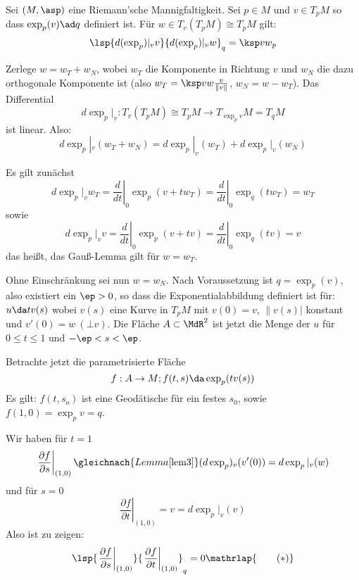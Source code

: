 \documentclass[a4paper,twoside,DIV15,BCOR12mm]{scrbook}
\begin{document}
\begin{satz}
\label{gausslemma} Sei $(M,\asp)$ eine Riemann’sche Mannigfaltigkeit. Sei $p\in M$ und $v\in T_pM$ so dass $\exp_p(v)\ad q$ definiert ist. Für $w\in T_v(T_pM) \cong T_pM$ gilt:
\[
\lsp {d(\exp_p)|_v v} {d(\exp_p)|_v w}_q = \ksp v w_p
\]
\end{satz}
\begin{beweis}
Zerlege $w = w_T + w_N$, wobei $w_T$ die Komponente in Richtung $v$ und $w_N$ die dazu orthogonale Komponente ist (also $w_T = \ksp v w \frac v {\|v\|}$, $w_N = w- w_T$). Das Differential 
\[
d\exp_p|_v : T_v(T_pM) \cong T_pM \to T_{\exp_pv}M = T_qM
\]
ist linear. Also: 
\[
d\exp_p|_v (w_T + w_N) = d\exp_p|_v(w_T) + d\exp_p|_v(w_N)
\]

Es gilt zunächst
\[
d\exp_p|_v w_T = \left.\frac d{dt}\right|_0 \exp_p(v + tw_T) = \left.\frac d{dt}\right|_0 \exp_q(tw_T) = w_T
\]
sowie
\[
d\exp_p|_v v = \left.\frac d{dt}\right|_0 \exp_p(v + tv) = \left.\frac d{dt}\right|_0 \exp_q(tv) = v
\]
das heißt, das Gauß-Lemma gilt für $w=w_T$.

Ohne Einschränkung sei nun $w=w_N$. Nach Voraussetzung ist $q=\exp_p(v)$, also existiert ein $\ep>0$, so dass die Exponentialabbildung definiert ist für: $u\da tv(s)$ wobei $v(s)$ eine Kurve in $T_pM$ mit $v(0)=v$, $\|v(s)|$ konstant und $v'(0)=w\>(\bot v)$. Die Fläche $A\subset \MdR^2$ ist jetzt die Menge der $u$ für $0\le t\le 1$ und $-\ep < s < \ep$.

Betrachte jetzt die parametrisierte Fläche
\[
f: A \to M ; f(t,s) \da \exp_p(tv(s))
\]
Es gilt: $f(t,s_o)$ ist eine Geodätische für ein festes $s_0$, sowie $f(1,0) = \exp_p v = q$.

Wir haben für $t=1$
\[
\left.\frac{\partial f}{\partial s}\right|_{(1,0)} \gleichnach{Lemma \ref{lem3}} (d\exp_p)_v(v'(0)) = d\exp_p|_v (w)
\]
und für $s=0$
\[
\left.\frac{\partial f}{\partial t}\right|_{(1,0)} = v = d\exp_p|_v(v)
\]
Also ist zu zeigen:
\[
\lsp {\left.\frac{\partial f}{\partial s}\right|_{(1,0)} }{\left.\frac{\partial f}{\partial t}\right|_{(1,0)} }_q = 0 \mathrlap{\qquad (*)}
\]


\end{beweis}
\end{document}
